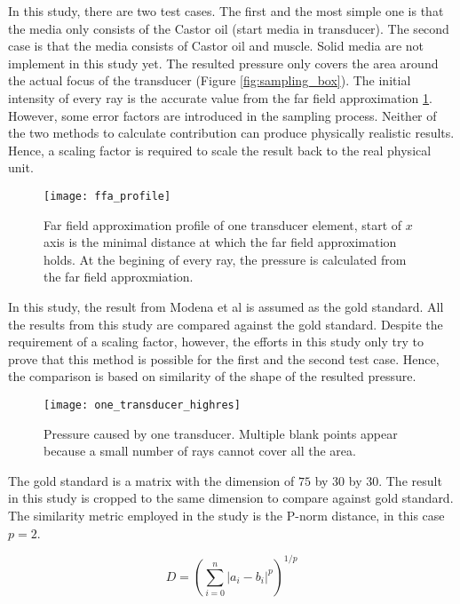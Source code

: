 
In this study, there are two test cases. The first and the most simple one is that the media only consists of the Castor oil (start media in transducer). The second case is that the media consists of Castor oil and muscle. Solid media are not implement in this study yet. The resulted pressure only covers the area around the actual focus of the transducer (Figure \ref{fig:sampling_box}). The initial intensity of every ray is the accurate value from the far field approximation \ref{fig:ffa_profile}. However, some error factors are introduced in the sampling process. Neither of the two methods to calculate contribution can produce physically realistic results. Hence, a scaling factor is required to scale the result back to the real physical unit.

\begin{figure}[h]
    \centering
    \texttt{[image: ffa\_profile]}
    \caption{Far field approximation profile of one transducer element, start of $x$ axis is the minimal distance at which the far field approximation holds. At the begining of every ray, the pressure is calculated from the far field approxmiation.}
    \label{fig:ffa_profile}
\end{figure}

In this study, the result from Modena et al \cite{Modena_2018} is assumed as the gold standard. All the results from this study are compared against the gold standard. Despite the requirement of a scaling factor, however, the efforts in this study only try to prove that this method is possible for the first and the second test case. Hence, the comparison is based on similarity of the shape of the resulted pressure.

\begin{figure}[h]
    \centering
    \texttt{[image: one\_transducer\_highres]}
    \caption{Pressure caused by one transducer. Multiple blank points appear because a small number of rays cannot cover all the area.}
    \label{fig:one_transducer_intensity}
\end{figure}

The gold standard is a matrix with the dimension of $75$ by $30$ by $30$. The result in this study is cropped to the same dimension to compare against gold standard. The similarity metric employed in the study is the P-norm distance, in this case $p=2$.

\begin{equation} \label{eq:pnorm}
    D=\left(\sum_{i=0}^{n}|a_i - b_i|^p\right)^{1/p}
\end{equation}

